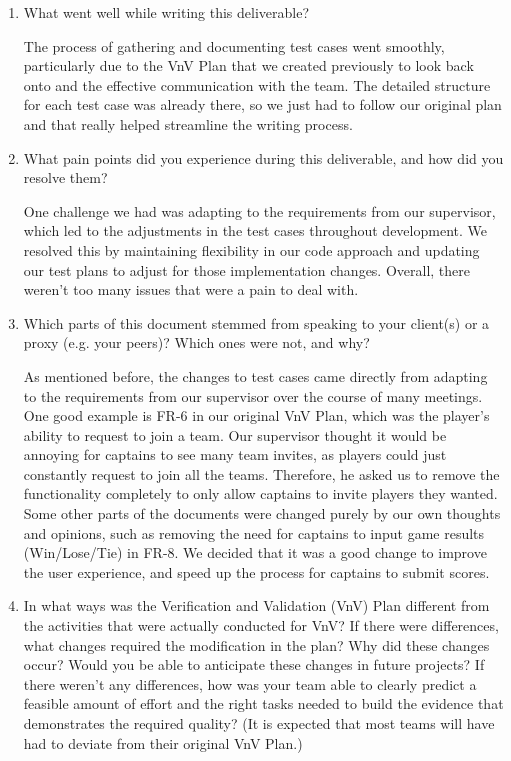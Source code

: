 \documentclass[12pt, titlepage]{article}
\begin{document}


\begin{enumerate}
  \item What went well while writing this deliverable?
  
  The process of gathering and documenting test cases went smoothly, particularly due to the VnV Plan that we created previously to look back onto and the effective communication with the team. The detailed structure for each test case was already there, so we just had to follow our original plan and that really helped streamline the writing process.
  
  \item What pain points did you experience during this deliverable, and how
    did you resolve them?
    
    One challenge we had was adapting to the requirements from our supervisor, which led to the adjustments in the test cases throughout development. We resolved this by maintaining flexibility in our code approach and updating our test plans to adjust for those implementation changes. Overall, there weren't too many issues that were a pain to deal with.
     
  \item Which parts of this document stemmed from speaking to your client(s) or
  a proxy (e.g. your peers)? Which ones were not, and why?
  
  As mentioned before, the changes to test cases came directly from adapting to the requirements from our supervisor over the course of many meetings. One good example is FR-6 in our original VnV Plan, which was the player's ability to request to join a team. Our supervisor thought it would be annoying for captains to see many team invites, as players could just constantly request to join all the teams. Therefore, he asked us to remove the functionality completely to only allow captains to invite players they wanted. Some other parts of the documents were changed purely by our own thoughts and opinions, such as removing the need for captains to input game results (Win/Lose/Tie) in FR-8. We decided that it was a good change to improve the user experience, and speed up the process for captains to submit scores.
  
  \item In what ways was the Verification and Validation (VnV) Plan different
  from the activities that were actually conducted for VnV?  If there were
  differences, what changes required the modification in the plan?  Why did
  these changes occur?  Would you be able to anticipate these changes in future
  projects?  If there weren't any differences, how was your team able to clearly
  predict a feasible amount of effort and the right tasks needed to build the
  evidence that demonstrates the required quality?  (It is expected that most
  teams will have had to deviate from their original VnV Plan.)
  

\end{enumerate}
\end{document}

